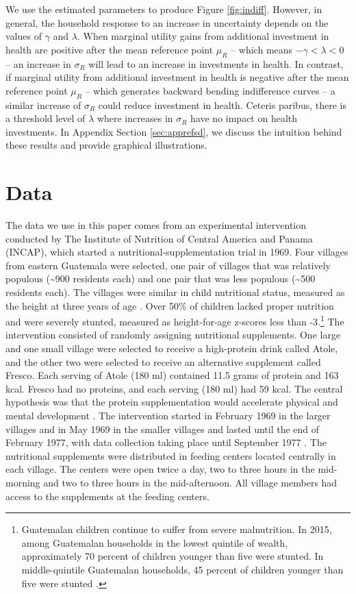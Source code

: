 We use the estimated parameters to produce Figure \ref{fig:indiff}. However, in general, the household response to an increase in uncertainty depends on the values of $\gamma$ and $\lambda$. When marginal utility gains from additional investment in health are positive after the mean reference point $\mu_{R}$ -- which means $-\gamma < \lambda < 0$ -- an increase in $\sigma_{R}$ will lead to an increase in investments in health. In contrast, if marginal utility from additional investment in health is negative after the mean reference point $\mu_{R}$ -- which generates backward bending indifference curves -- a similar increase of $\sigma_{R}$ could reduce investment in health. Ceteris paribus, there is a threshold level of $\lambda$ where increases in $\sigma_{R}$ have no impact on health investments. In Appendix Section \ref{sec:apprefsd}, we discuss the intuition behind these results and provide graphical illustrations.


\section{Data}


The data we use in this paper comes from an experimental intervention conducted by The Institute of Nutrition of Central America and Panama (INCAP), which started a nutritional-supplementation trial in 1969. Four villages from eastern Guatemala were selected, one pair of villages that was relatively populous (\textasciitilde900 residents each) and one pair that was less populous (\textasciitilde500 residents each). The villages were similar in child nutritional status, measured as the height at three years of age \autocite{habicht_nutritional_1995}. Over 50\% of children lacked proper nutrition and were severely stunted, measured as height-for-age z-scores less than -3.\footnote{Guatemalan children continue to suffer from severe malnutrition. In 2015, among Guatemalan households in the lowest quintile of wealth, approximately 70 percent of children younger than five were stunted. In middle-quintile Guatemalan households, 45 percent of children younger than five were stunted \autocite{fao_state_2019}.} The intervention consisted of randomly assigning nutritional supplements. One large and one small village were selected to receive a high-protein drink called Atole, and the other two were selected to receive an alternative supplement called Fresco. Each serving of Atole (180 ml) contained 11.5 grams of protein and 163 kcal. Fresco had no proteins, and each serving (180 ml) had 59 kcal. The central hypothesis was that the protein supplementation would accelerate physical and mental development \autocite{habicht_nutritional_1995}. The intervention started in February 1969 in the larger villages and in May 1969 in the smaller villages and lasted until the end of February 1977, with data collection taking place until September 1977 \autocite{maluccio_impact_2009,islam_evidence_2009}. The nutritional supplements were distributed in feeding centers located centrally in each village. The centers were open twice a day, two to three hours in the mid-morning and two to three hours in the mid-afternoon. All village members had access to the supplements at the feeding centers.


